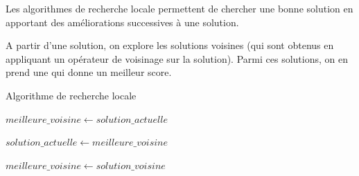 Les algorithmes de recherche locale permettent de chercher une bonne solution en apportant des améliorations successives à une solution.

A partir d'une solution, on explore les solutions voisines (qui sont obtenus en appliquant un opérateur de voisinage sur la solution).
Parmi ces solutions, on en prend une qui donne un meilleur score.

\begin{algorithm}
	\caption{Algorithme de recherche locale} 
	\label{algo:recherche_locale}

	$meilleure\_voisine \gets solution\_actuelle$

	{
		$solution\_actuelle \gets meilleure\_voisine$

		{
			{
				$meilleure\_voisine \gets solution\_voisine$
			}
		}
	}
\end{algorithm}